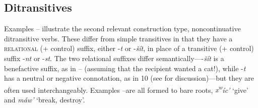 \documentclass[output=paper,colorlinks,citecolor=brown]{langscibook}
\begin{document}
\subsection{Ditransitives}   %
\label{thomason_section_2.2}

Examples -- illustrate the second relevant construction type,
noncontinuative ditransitive verbs.  These differ from simple
transitives in that they have a \textsc{relational} (+ control) suffix,
either -\emph{{\textltilde}t} or -\emph{\v{s}\'it}, in place of a
transitive (+ control) suffix -\emph{nt} or -\emph{st}.  The two
relational suffixes differ semantically----\emph{\v{s}\'it} is a
benefactive suffix, as in -- (assuming that the recipient wanted a
cat!), while -\emph{{\textltilde}t} has a neutral or negative
connotation, as in 10 (see \citealt{Carlson:1980} for discussion)---but they
are often used interchangeably.  Examples --are all formed to bare
roots, \emph{{x\textsuperscript w}\'ic'} `give' and \emph{m\'aw'}
`break, destroy'.
\end{document}
